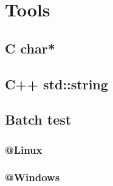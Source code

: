 \section{Tools}
	\subsection{C char*}
		
	\subsection{C++ std::string}
		
	\subsection{Batch test}
		\subsubsection{@Linux}
			
		\subsubsection{@Windows}
			
